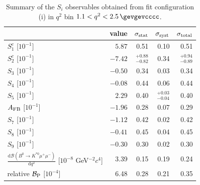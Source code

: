 \begin{table}\centering
\caption{Summary of the $S_{i}$ observables obtained from fit configuration (i) in $q^{2}$ bin \mbox{$1.1 < q^{2} < 2.5\,\gevgevcccc$}.}
\label{sec:fit_results:si_s1c:table:summary_bin1}
\begin{tabular}{lrrrr}
\toprule
 & value & $\sigma_{\rm stat}$ & $\sigma_{\rm syst}$ & $\sigma_{\rm total}$ \\
\midrule
$S_{1}^{c}$ [$ 10^{-1}$] & $5.87$ & 0.51 & 0.10 & 0.51 \\
$S_{2}^{c}$ [$ 10^{-1}$] & $-7.42$ & $^{+0.88}_{-0.82}$ & 0.34 & $^{+0.94}_{-0.89}$ \\
$S_{3}$ [$ 10^{-1}$] & $-0.50$ & 0.34 & 0.03 & 0.34 \\
$S_{4}$ [$ 10^{-1}$] & $-0.08$ & 0.44 & 0.06 & 0.44 \\
$S_{5}$ [$ 10^{-1}$] & $2.29$ & 0.40 & $^{+0.03}_{-0.04}$ & 0.40 \\
$A_{\rm FB}$ [$ 10^{-1}$] & $-1.96$ & 0.28 & 0.07 & 0.29 \\
$S_{7}$ [$ 10^{-1}$] & $-1.12$ & 0.42 & 0.02 & 0.42 \\
$S_{8}$ [$ 10^{-1}$] & $-0.41$ & 0.45 & 0.04 & 0.45 \\
$S_{9}$ [$ 10^{-1}$] & $-0.30$ & 0.30 & 0.02 & 0.30 \\
\midrule
$\frac{\mathrm{d}\mathcal{B}(B^{0}\to K^{\ast 0}\mu^{+}\mu^{-})}{\mathrm{d} q^{2}}$ [$ 10^{-8}$ GeV$^{-2}c^{4}$] & 3.39 & 0.15 & 0.19 & 0.24 \\
relative $\mathcal{B}_{\rm P}$ [$10^{-4}$] & 6.48 & 0.28 & 0.21 & 0.35 \\
\bottomrule
\end{tabular}
\end{table}
